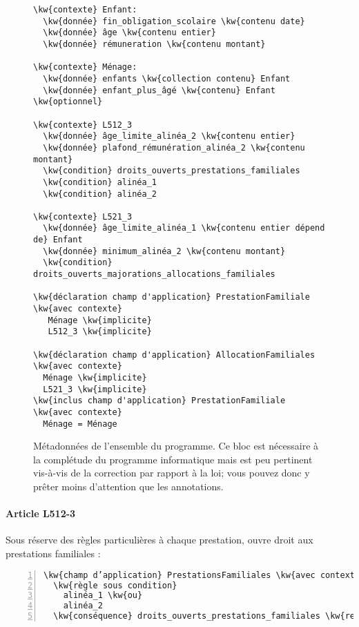 \documentclass[12pt, french]{article}
\newcommand{\kw}[1]{\textbf{\textcolor{OliveGreen}{#1}}}
\newenvironment{metadata}{
  \begin{tcolorbox}[colframe=OliveGreen, title=\textcolor{black}{\texttt{Métadonnées}}, before skip=1em, after skip=1em]
}{
\end{tcolorbox}
}
\begin{document}
\begin{figure}[htpb]
\begin{metadata}
\begin{Verbatim}[commandchars=\\\{\}]
\kw{contexte} Enfant:
  \kw{donnée} fin_obligation_scolaire \kw{contenu date}
  \kw{donnée} âge \kw{contenu entier}
  \kw{donnée} rémuneration \kw{contenu montant}

\kw{contexte} Ménage:
  \kw{donnée} enfants \kw{collection contenu} Enfant
  \kw{donnée} enfant_plus_âgé \kw{contenu} Enfant \kw{optionnel}

\kw{contexte} L512_3
  \kw{donnée} âge_limite_alinéa_2 \kw{contenu entier}
  \kw{donnée} plafond_rémunération_alinéa_2 \kw{contenu montant}
  \kw{condition} droits_ouverts_prestations_familiales
  \kw{condition} alinéa_1
  \kw{condition} alinéa_2

\kw{contexte} L521_3
  \kw{donnée} âge_limite_alinéa_1 \kw{contenu entier dépend de} Enfant
  \kw{donnée} minimum_alinéa_2 \kw{contenu montant}
  \kw{condition} droits_ouverts_majorations_allocations_familiales

\kw{déclaration champ d'application} PrestationFamiliale \kw{avec contexte}
   Ménage \kw{implicite}
   L512_3 \kw{implicite}

\kw{déclaration champ d'application} AllocationFamiliales \kw{avec contexte}
  Ménage \kw{implicite}
  L521_3 \kw{implicite}
\kw{inclus champ d'application} PrestationFamiliale \kw{avec contexte}
  Ménage = Ménage
\end{Verbatim}
\end{metadata}
\caption{Métadonnées de l'ensemble du programme. Ce bloc est nécessaire à la complétude du programme informatique
mais est peu pertinent vis-à-vis de la correction par rapport à la loi; vous pouvez donc y prêter moins d'attention que les annotations.}
\end{figure}

\paragraph{Article L512-3} Sous réserve des règles particulières à chaque prestation, ouvre droit aux prestations familiales :

\begin{Verbatim}[commandchars=\\\{\}, numbers=left,xleftmargin=5mm, firstnumber=1]
\kw{champ d’application} PrestationsFamiliales \kw{avec contexte} L512_3 :
  \kw{règle sous condition}
    alinéa_1 \kw{ou}
    alinéa_2
  \kw{conséquence} droits_ouverts_prestations_familiales \kw{rempli}
\end{Verbatim}
\end{document}
